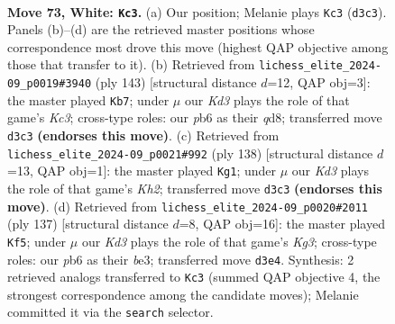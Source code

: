 \documentclass[11pt]{article}
\begin{document}
\clearpage

\begin{figure}[p]\centering
\begin{subfigure}{0.46\textwidth}\centering
\resizebox{\linewidth}{!}{%
\newchessgame
\chessboard[
  setfen={8/8/1p6/p7/q1P5/3K3k/8/8 w - - 2 73},
  showmover=false,
  pgfstyle=straightmove, color=movearrow, markmove={d3-c3}
]}
\caption{}
\end{subfigure}\hfill
\begin{subfigure}{0.46\textwidth}\centering
\resizebox{\linewidth}{!}{%
\newchessgame
\chessboard[
  setfen={3Q4/8/2k5/8/Q7/P5K1/8/8 b - - 0 72},
  showmover=false,
  pgfstyle=straightmove, color=movearrow, markmove={c6-b7}
]}
\caption{}
\end{subfigure}
\\[4pt]
\begin{subfigure}{0.46\textwidth}\centering
\resizebox{\linewidth}{!}{%
\newchessgame
\chessboard[
  setfen={8/4k3/8/7p/7q/8/6PK/8 w - - 0 70},
  showmover=false,
  pgfstyle=straightmove, color=movearrow, markmove={h2-g1}
]}
\caption{}
\end{subfigure}\hfill
\begin{subfigure}{0.46\textwidth}\centering
\resizebox{\linewidth}{!}{%
\newchessgame
\chessboard[
  setfen={8/8/6k1/7p/7Q/4B2P/6K1/8 b - - 8 69},
  showmover=false,
  pgfstyle=straightmove, color=movearrow, markmove={g6-f5}
]}
\caption{}
\end{subfigure}
\caption{\textbf{Move 73, White: \texttt{Kc3}.} (a) Our position; Melanie plays \texttt{Kc3} (\texttt{d3c3}). Panels (b)--(d) are the retrieved master positions whose correspondence most drove this move (highest QAP objective among those that transfer to it). (b) Retrieved from \texttt{lichess\_elite\_2024-09\_p0019\#3940} (ply 143) [structural distance $d$=12, QAP obj=3]: the master played \texttt{Kb7}; under $\mu$ our \emph{Kd3} plays the role of that game's \emph{Kc3}; cross-type roles: our \emph{p}b6 as their \emph{q}d8; transferred move \texttt{d3c3} \textbf{(endorses this move)}. (c) Retrieved from \texttt{lichess\_elite\_2024-09\_p0021\#992} (ply 138) [structural distance $d$=13, QAP obj=1]: the master played \texttt{Kg1}; under $\mu$ our \emph{Kd3} plays the role of that game's \emph{Kh2}; transferred move \texttt{d3c3} \textbf{(endorses this move)}. (d) Retrieved from \texttt{lichess\_elite\_2024-09\_p0020\#2011} (ply 137) [structural distance $d$=8, QAP obj=16]: the master played \texttt{Kf5}; under $\mu$ our \emph{Kd3} plays the role of that game's \emph{Kg3}; cross-type roles: our \emph{p}b6 as their \emph{b}e3; transferred move \texttt{d3e4}. Synthesis: 2 retrieved analogs transferred to \texttt{Kc3} (summed QAP objective 4, the strongest correspondence among the candidate moves); Melanie committed it via the \texttt{search} selector.}
\label{fig:thought-m144}
\end{figure}
\end{document}
